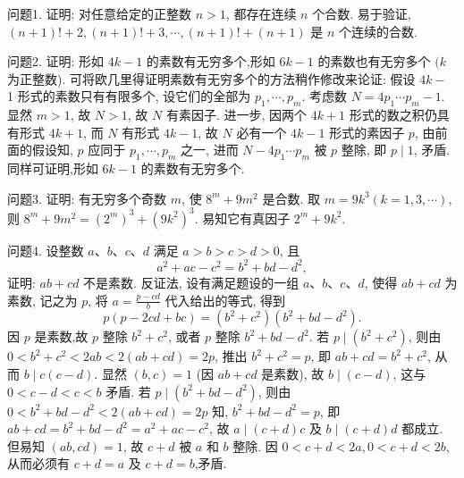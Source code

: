 
问题1. 证明: 对任意给定的正整数 $n>1$, 都存在连续 $n$ 个合数.
易于验证, $(n+1) !+2,(n+1) !+3, \cdots,(n+1) !+(n+1)$ 是 $n$ 个连续的合数.



问题2. 证明: 形如 $4 k-1$ 的素数有无穷多个,形如 $6 k-1$ 的素数也有无穷多个 $(k$ 为正整数).
可将欧几里得证明素数有无穷多个的方法稍作修改来论证: 假设 $4 k-$ 1 形式的素数只有有限多个, 设它们的全部为 $p_1, \cdots, p_m$. 考虑数 $N= 4 p_1 \cdots p_m-1$. 显然 $m>1$, 故 $N>1$, 故 $N$ 有素因子.
进一步, 因两个 $4 k+1$ 形式的数之积仍具有形式 $4 k+1$, 而 $N$ 有形式 $4 k-1$, 故 $N$ 必有一个 $4 k-1$ 形式的素因子 $p$, 由前面的假设知, $p$ 应同于 $p_1, \cdots, p_m$ 之一, 进而 $N-4 p_1 \cdots p_m$ 被 $p$ 整除, 即 $p \mid 1$, 矛盾.
同样可证明,形如 $6 k-1$ 的素数有无穷多个.



问题3. 证明: 有无穷多个奇数 $m$, 使 $8^m+9 m^2$ 是合数.
取 $m=9 k^3(k=1,3, \cdots)$, 则 $8^m+9 m^2=\left(2^m\right)^3+\left(9 k^2\right)^3$. 易知它有真因子 $2^m+9 k^2$.



问题4. 设整数 $a 、 b 、 c 、 d$ 满足 $a>b>c>d>0$, 且
$$
a^2+a c-c^2=b^2+b d-d^2,
$$
证明: $a b+c d$ 不是素数.
反证法, 设有满足题设的一组 $a 、 b 、 c 、 d$, 使得 $a b+c d$ 为素数, 记之为 $p$, 将 $a=\frac{p-c d}{b}$ 代入给出的等式, 得到
$$
p(p-2 c d+b c)=\left(b^2+c^2\right)\left(b^2+b d-d^2\right) .
$$
因 $p$ 是素数,故 $p$ 整除 $b^2+c^2$, 或者 $p$ 整除 $b^2+b d-d^2$.
若 $p \mid\left(b^2+c^2\right)$, 则由 $0<b^2+c^2<2 a b<2(a b+c d)=2 p$, 推出 $b^2+ c^2=p$, 即 $a b+c d=b^2+c^2$, 从而 $b \mid c(c-d)$. 显然 $(b, c)=1$ (因 $a b+c d$ 是素数), 故 $b \mid(c-d)$, 这与 $0<c-d<c<b$ 矛盾.
若 $p \mid\left(b^2+b d-d^2\right)$, 则由 $0<b^2+b d-d^2<2(a b+c d)=2 p$ 知, $b^2+ b d-d^2=p$, 即 $a b+c d=b^2+b d-d^2=a^2+a c-c^2$, 故 $a \mid(c+d) c$ 及 $b \mid(c+d) d$ 都成立.
但易知 $(a b, c d)=1$, 故 $c+d$ 被 $a$ 和 $b$ 整除.
因 $0<c+ d<2 a, 0<c+d<2 b$, 从而必须有 $c+d=a$ 及 $c+d=b$,矛盾.


